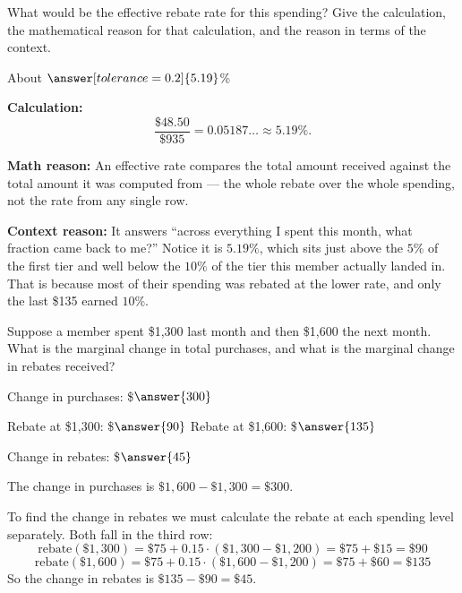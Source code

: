 \documentclass[12pt]{ximera}
\begin{document}
\begin{problem}
What would be the effective rebate rate for this spending? Give the calculation, the
mathematical reason for that calculation, and the reason in terms of the context.

About $\answer[tolerance=0.2]{5.19}$\%

\begin{freeResponse}
\end{freeResponse}

\begin{solution}
\textbf{Calculation:}
\[
\frac{\$48.50}{\$935} = 0.05187\ldots \approx 5.19\%.
\]

\textbf{Math reason:} An effective rate compares the total amount received against the
total amount it was computed from --- the whole rebate over the whole spending, not the
rate from any single row.

\textbf{Context reason:} It answers ``across everything I spent this month, what
fraction came back to me?'' Notice it is $5.19\%$, which sits just above the $5\%$ of
the first tier and well below the $10\%$ of the tier this member actually landed in.
That is because most of their spending was rebated at the lower rate, and only the last
\$135 earned $10\%$.
\end{solution}
\end{problem}

\begin{problem}
Suppose a member spent \$1,300 last month and then \$1,600 the next month. What is the
marginal change in total purchases, and what is the marginal change in rebates received?

Change in purchases: \$$\answer{300}$

Rebate at \$1,300: \$$\answer{90}$ \qquad Rebate at \$1,600: \$$\answer{135}$

Change in rebates: \$$\answer{45}$

\begin{freeResponse}
\end{freeResponse}

\begin{solution}
The change in purchases is $\$1{,}600 - \$1{,}300 = \$300$.

To find the change in rebates we must calculate the rebate at each spending level
separately. Both fall in the third row:
\[
\text{rebate}(\$1{,}300) = \$75 + 0.15 \cdot (\$1{,}300 - \$1{,}200) = \$75 + \$15 = \$90
\]
\[
\text{rebate}(\$1{,}600) = \$75 + 0.15 \cdot (\$1{,}600 - \$1{,}200) = \$75 + \$60 = \$135
\]
So the change in rebates is $\$135 - \$90 = \$45$.
\end{solution}
\end{problem}
\end{document}
